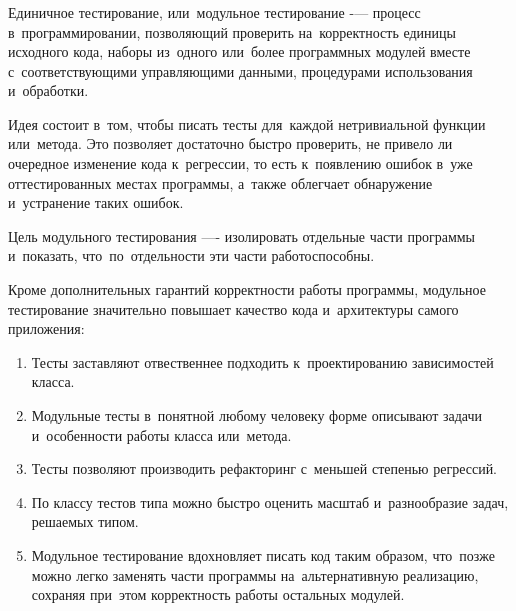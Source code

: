 \subsubsection{}
\label{sec:testing:unit:defenition}

Единичное тестирование, или~модульное тестирование -— процесс в~программировании, позволяющий проверить на~корректность единицы исходного кода, наборы из~одного или~более программных модулей вместе с~соответствующими управляющими данными, процедурами использования и~обработки.

Идея состоит в~том, чтобы писать тесты для~каждой нетривиальной функции или~метода. Это позволяет достаточно быстро проверить, не привело ли очередное изменение кода к~регрессии, то есть к~появлению ошибок в~уже оттестированных местах программы, а~также облегчает обнаружение и~устранение таких ошибок. 

Цель модульного тестирования —- изолировать отдельные части программы и~показать, что~по~отдельности эти части работоспособны\cite{wiki:unit}.

Кроме дополнительных гарантий корректности работы программы, модульное тестирование значительно повышает качество кода и~архитектуры самого приложения:

\begin{enumerate}
	\item Тесты заставляют отвественнее подходить к~проектированию зависимостей класса.
	\item Модульные тесты в~понятной любому человеку форме описывают задачи и~особенности работы класса или~метода.
	\item Тесты позволяют производить рефакторинг с~меньшей степенью регрессий.
	\item По классу тестов типа можно быстро оценить масштаб и~разнообразие задач, решаемых типом.
	\item Модульное тестирование вдохновляет писать код таким образом, что~позже можно легко заменять части программы на~альтернативную реализацию, сохраняя при~этом корректность работы остальных модулей.
\end{enumerate}
